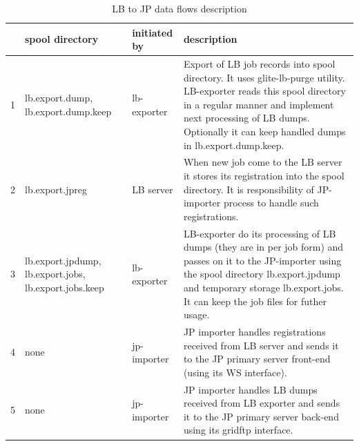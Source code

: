 \documentclass{egee}
\begin{document}
\begin{table}[htpb]
 \centering
  \begin{tabular}{|c|p{3cm}|l|p{9cm}|}
    \hline
    &spool directory&initiated by&description\\
    \hline
    \hline
    1&lb.export.dump,
      lb.export.dump.keep&lb-exporter&
      Export of LB job records into spool directory. It uses glite-lb-purge utility. LB-exporter reads this spool directory in a regular manner and implement next processing of LB dumps. Optionally it can keep handled dumps in lb.export.dump.keep.\\
    \hline
    2&lb.export.jpreg&LB server&When new job come to the LB server 
    it stores its
    registration into the spool directory. It is responsibility of
    JP-importer process to handle such registrations.\\
    \hline
    3&lb.export.jpdump,
      lb.export.jobs,
      lb.export.jobs.keep&lb-exporter&
      LB-exporter do its processing of LB dumps (they are in per job form) and passes on it to the JP-importer using the spool directory lb.export.jpdump and temporary storage lb.export.jobs. It can keep the job files for futher usage.\\
    \hline
    4&none&jp-importer&JP importer handles registrations received from LB
    server and sends it to the JP primary server front-end (using its WS
    interface).\\
    \hline
    5&none&jp-importer&JP importer handles LB dumps received from LB
    exporter and sends it to the JP primary server back-end using its
    gridftp interface.\\
    \hline
  \end{tabular}
  \caption{LB to JP data flows description}
  \label{tab:LB-JP-interactions}
\end{table}
\end{document}
